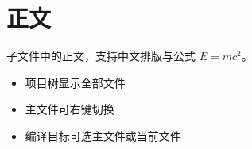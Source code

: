 \section{正文}

子文件中的正文，支持中文排版与公式 $E=mc^2$。

\begin{itemize}
  \item 项目树显示全部文件
  \item 主文件可右键切换
  \item 编译目标可选主文件或当前文件
\end{itemize}
